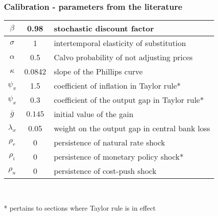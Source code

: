 \documentclass[10pt]{beamer}
\begin{document}
\begin{frame}
	\frametitle{Calibration - parameters from the literature}

\begin{center}
\begin{table}
\begin{tabular}{ c | c  | l }
\hline
 $\beta$ & 0.98 & stochastic discount factor \\  \hline
 $\sigma$ & 1  & intertemporal elasticity of substitution \\  \hline
 $\alpha$ & 0.5 &  Calvo probability of not adjusting prices \\\hline
 $\kappa$ & 0.0842 &  slope of the Phillips curve \\\hline
 $\psi_{\pi} $& 1.5  & coefficient of inflation in Taylor rule*\\\hline
 $\psi_x$ & 0.3   & coefficient of the output gap in Taylor rule*  \\\hline 
 $\bar{g}$ & $0.145$  & initial value of the gain \\\hline 
 $\lambda_x$ & 0.05 & weight on the output gap in central bank loss   \\ \hline  
 $\rho_r$ & 0 &   persistence of natural rate shock \\ \hline 
 $\rho_i$ & 0 &  persistence of monetary policy shock*  \\ \hline
 $\rho_u$ & 0  &  persistence of cost-push shock  \\ \hline
   \end{tabular}     
   \label{calibration_lit}
 \end{table}
\end{center}

\

\small{* pertains to sections where Taylor rule is in effect}

\end{frame}

\end{document}
